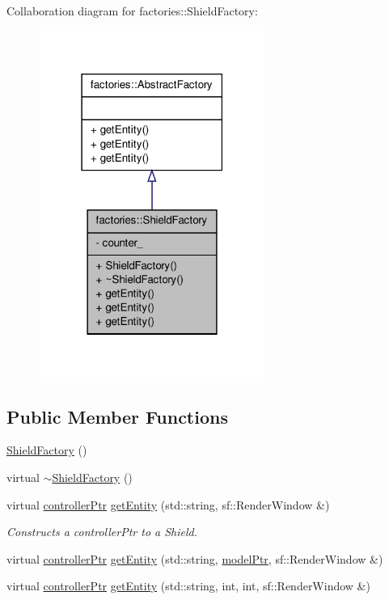 \-Collaboration diagram for factories\-:\-:\-Shield\-Factory\-:
\nopagebreak
\begin{figure}[H]
\begin{center}
\leavevmode
\includegraphics[width=210pt]{d2/d57/classfactories_1_1ShieldFactory__coll__graph}
\end{center}
\end{figure}
\subsection*{\-Public \-Member \-Functions}
\begin{DoxyCompactItemize}
\item 
\hyperlink{classfactories_1_1ShieldFactory_a871347e84fb1b0ed8c10049c7dd3fe99}{\-Shield\-Factory} ()
\item 
virtual \hyperlink{classfactories_1_1ShieldFactory_afe2d2a980b7b6a5394002bccf0d0a48e}{$\sim$\-Shield\-Factory} ()
\item 
virtual \hyperlink{Game_8h_a21b04f6cf2d5990b82725fac5ea2ce9a}{controller\-Ptr} \hyperlink{classfactories_1_1ShieldFactory_a32b4bc425dc0854110fa9dbf18663c7c}{get\-Entity} (std\-::string, sf\-::\-Render\-Window \&)
\begin{DoxyCompactList}\small\item\em \-Constructs a controller\-Ptr to a \-Shield. \end{DoxyCompactList}\item 
virtual \hyperlink{Game_8h_a21b04f6cf2d5990b82725fac5ea2ce9a}{controller\-Ptr} \hyperlink{classfactories_1_1ShieldFactory_a8752c0c8b1f9a39139aa948ec13a737b}{get\-Entity} (std\-::string, \hyperlink{ModelView_8h_a78966ddb517fca8d2b29a2bc5c31e74e}{model\-Ptr}, sf\-::\-Render\-Window \&)
\item 
virtual \hyperlink{Game_8h_a21b04f6cf2d5990b82725fac5ea2ce9a}{controller\-Ptr} \hyperlink{classfactories_1_1ShieldFactory_ae7c23542c065b4340474af3f9c0ad598}{get\-Entity} (std\-::string, int, int, sf\-::\-Render\-Window \&)
\end{DoxyCompactItemize}
